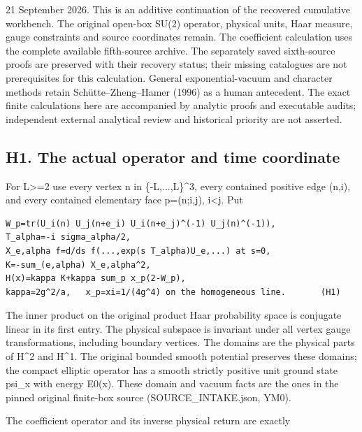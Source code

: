 \documentclass[11pt,a4paper]{article}
\renewcommand{\[}{\begingroup\small\originaldisplaystart}
\renewcommand{\]}{\originaldisplayend\endgroup}
\begin{document}
21 September 2026. This is an additive continuation of the recovered
cumulative workbench. The original open-box SU(2) operator, physical
units, Haar measure, gauge constraints and source coordinates remain.
The coefficient calculation uses the complete available fifth-source
archive. The separately saved sixth-source proofs are preserved with
their recovery status; their missing catalogues are not prerequisites
for this calculation. General exponential-vacuum and character methods
retain Schütte--Zheng--Hamer (1996) as a human antecedent. The exact
finite calculations here are accompanied by analytic proofs and
executable audits; independent external analytical review and historical
priority are not asserted.

\subsection{H1. The actual operator and time
coordinate}\label{h1.-the-actual-operator-and-time-coordinate}

For L\textgreater=2 use every vertex n in \{-L,...,L\}\^{}3, every
contained positive edge (n,i), and every contained elementary face
p=(n;i,j), i\textless j. Put

\begin{verbatim}
W_p=tr(U_i(n) U_j(n+e_i) U_i(n+e_j)^(-1) U_j(n)^(-1)),
T_alpha=-i sigma_alpha/2,
X_e,alpha f=d/ds f(...,exp(s T_alpha)U_e,...) at s=0,
K=-sum_(e,alpha) X_e,alpha^2,
H(x)=kappa K+kappa sum_p x_p(2-W_p),
kappa=2g^2/a,   x_p=xi=1/(4g^4) on the homogeneous line.       (H1)
\end{verbatim}

The inner product on the original product Haar probability space is
conjugate linear in its first entry. The physical subspace is invariant
under all vertex gauge transformations, including boundary vertices. The
domains are the physical parts of H\^{}2 and H\^{}1. The original
bounded smooth potential preserves these domains; the compact elliptic
operator has a smooth strictly positive unit ground state psi\_x with
energy E0(x). These domain and vacuum facts are the ones in the pinned
original finite-box source
{(\allowbreak{}S\allowbreak{}O\allowbreak{}U\allowbreak{}R\allowbreak{}C\allowbreak{}E\allowbreak{}\_\allowbreak{}I\allowbreak{}N\allowbreak{}T\allowbreak{}A\allowbreak{}K\allowbreak{}E\allowbreak{}.\allowbreak{}j\allowbreak{}s\allowbreak{}o\allowbreak{}n\allowbreak{},\allowbreak{}}
YM0).

The coefficient operator and its inverse physical return are exactly
\end{document}
